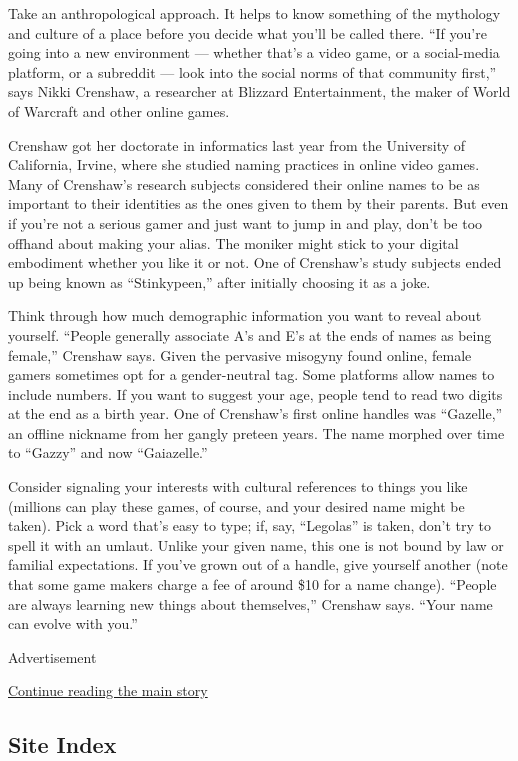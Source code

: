 Take an anthropological approach. It helps to know something of the
mythology and culture of a place before you decide what you'll be called
there. ``If you're going into a new environment --- whether that's a
video game, or a social-media platform, or a subreddit --- look into the
social norms of that community first,'' says Nikki Crenshaw, a
researcher at Blizzard Entertainment, the maker of World of Warcraft and
other online games.

Crenshaw got her doctorate in informatics last year from the University
of California, Irvine, where she studied naming practices in online
video games. Many of Crenshaw's research subjects considered their
online names to be as important to their identities as the ones given to
them by their parents. But even if you're not a serious gamer and just
want to jump in and play, don't be too offhand about making your alias.
The moniker might stick to your digital embodiment whether you like it
or not. One of Crenshaw's study subjects ended up being known as
``Stinkypeen,'' after initially choosing it as a joke.

Think through how much demographic information you want to reveal about
yourself. ``People generally associate A's and E's at the ends of names
as being female,'' Crenshaw says. Given the pervasive misogyny found
online, female gamers sometimes opt for a gender-neutral tag. Some
platforms allow names to include numbers. If you want to suggest your
age, people tend to read two digits at the end as a birth year. One of
Crenshaw's first online handles was ``Gazelle,'' an offline nickname
from her gangly preteen years. The name morphed over time to ``Gazzy''
and now ``Gaiazelle.''

Consider signaling your interests with cultural references to things you
like (millions can play these games, of course, and your desired name
might be taken). Pick a word that's easy to type; if, say, ``Legolas''
is taken, don't try to spell it with an umlaut. Unlike your given name,
this one is not bound by law or familial expectations. If you've grown
out of a handle, give yourself another (note that some game makers
charge a fee of around \$10 for a name change). ``People are always
learning new things about themselves,'' Crenshaw says. ``Your name can
evolve with you.''

Advertisement

\protect\hyperlink{after-bottom}{Continue reading the main story}

\hypertarget{site-index}{%
\subsection{Site Index}\label{site-index}}

